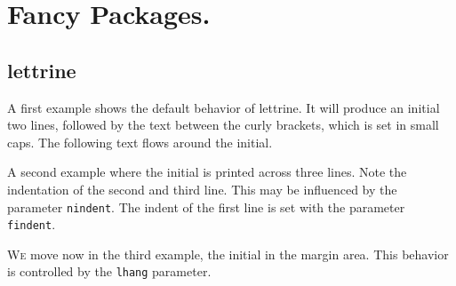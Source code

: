 %


 
\clearpage
\section{Fancy Packages.}


\subsection{lettrine}

\begin{filecontents*}{\democodefile}
\lettrine{A}{} first example shows the default behavior of lettrine.
It will produce an initial two lines, followed by the text between
the curly brackets, which is set in small caps. The following text flows
 around the initial.
\end{filecontents*}

%

\begin{filecontents*}{\democodefile}
\lettrine[lines=3]{A}{} second example where the initial is printed across
three lines. Note the indentation of the second and third line. This may be
influenced by the parameter \texttt{nindent}. The indent of the first line is set with the parameter \texttt{findent}.
\end{filecontents*}

%

\begin{filecontents*}{\democodefile}
\lettrine[lhang=1, nindent=0pt, lines=3]{W}{e} move now in the third example,
the initial in the margin area. This behavior is controlled by the
\texttt{lhang} parameter.
\end{filecontents*}

%


